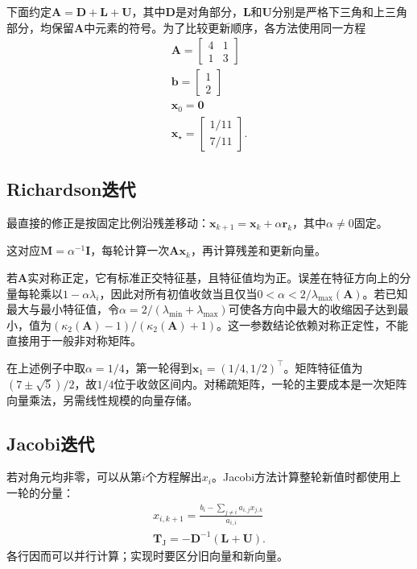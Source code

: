 下面约定$\bm A=\bm D+\bm L+\bm U$，其中$\bm D$是对角部分，$\bm L$和$\bm U$分别是严格下三角和上三角部分，均保留$\bm A$中元素的符号。为了比较更新顺序，各方法使用同一方程
\[
\begin{gathered}
\bm A=\begin{bmatrix}4&1\\1&3\end{bmatrix}\\
\bm b=\begin{bmatrix}1\\2\end{bmatrix}\\
\bm x_{0}=\bm0\\
\bm x_\star=\begin{bmatrix}1/11\\7/11\end{bmatrix}.
\end{gathered}
\]

\subsection{Richardson迭代}

最直接的修正是按固定比例沿残差移动：$\bm x_{k+1}=\bm x_{k}+\alpha\bm r_{k}$，其中$\alpha\ne0$固定。

这对应$\bm M=\alpha^{-1}\bm I$，每轮计算一次$\bm A\bm x_{k}$，再计算残差和更新向量。

若$\bm A$实对称正定，它有标准正交特征基，且特征值均为正。误差在特征方向上的分量每轮乘以$1-\alpha\lambda_i$，因此对所有初值收敛当且仅当$0<\alpha<2/\lambda_{\max}(\bm A)$。若已知最大与最小特征值，令$\alpha=2/(\lambda_{\min}+\lambda_{\max})$可使各方向中最大的收缩因子达到最小，值为$(\kappa_2(\bm A)-1)/(\kappa_2(\bm A)+1)$。这一参数结论依赖对称正定性，不能直接用于一般非对称矩阵。

在上述例子中取$\alpha=1/4$，第一轮得到$\bm x_{1}=(1/4,1/2)^\top$。矩阵特征值为$(7\pm\sqrt5)/2$，故$1/4$位于收敛区间内。对稀疏矩阵，一轮的主要成本是一次矩阵向量乘法，另需线性规模的向量存储。

\subsection{Jacobi迭代}

若对角元均非零，可以从第$i$个方程解出$x_i$。Jacobi方法计算整轮新值时都使用上一轮的分量：
\begin{equation}
\begin{gathered}
x_{i,k+1}=\frac{b_i-\sum_{j\ne i}a_{i,j}x_{j,k}}{a_{i,i}}\\
\bm T_{\mathrm J}=-\bm D^{-1}(\bm L+\bm U).
\end{gathered}
\label{eq:ls-jacobi-update}
\end{equation}
各行因而可以并行计算；实现时要区分旧向量和新向量。

